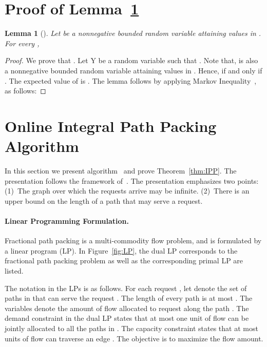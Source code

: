 \documentclass[11pt]{article}
\newtheorem{lemma}[theorem]{Lemma}
\newcommand{\route}{\text{\sc{ipp}}}
\newenvironment{proof sketch}[1]{\noindent {\emph{Proof sketch of #1:}}}{\hfill \qed}
\begin{document}
\section{Proof of Lemma~\ref{lemma:revMarkov}}\label{sec:RevMarkovproof}
\begin{lemma}[]\label{lemma:revMarkov}
  Let  be a nonnegative bounded random variable attaining values in . For every ,
  
\end{lemma}

\begin{proof}
    We prove that . Let Y be a random variable such that . Note that,  is also a nonnegative bounded random variable attaining values in . Hence,  if and only if . The expected value of  is . The lemma follows by applying Markov Inequality~\cite{MU}, as follows:
    
\end{proof}




\section{Online Integral Path Packing Algorithm \route}
\label{sect:routealg} \label{sec:IPP} In this section we present algorithm \route\
and prove Theorem~\ref{thm:IPP}. The presentation follows the framework
of~\cite{BN06,BNsurvey}. The presentation emphasizes two points: (1)~The graph over
which the requests arrive may be infinite. (2)~There is an upper bound  on the length
of a path that may serve a request.

\paragraph{Linear Programming Formulation.}
Fractional path packing is a multi-commodity flow problem, and is formulated by a
linear program (LP). In Figure~\ref{fig:LP}, the dual LP corresponds to the
fractional path packing problem as well as the corresponding primal LP are listed.

The notation in the LPs is as follows. For each request , let  denote the set
of paths in  that can serve the request . The length of every path
 is at most .  The variables  denote the amount of flow
allocated to request  along the path . The demand constraint in the dual LP
states that at most one unit of flow can be jointly allocated to all the paths in
. The capacity constraint states that at most  units of flow can traverse
an edge . The objective is to maximize the flow amount.
\end{document}
